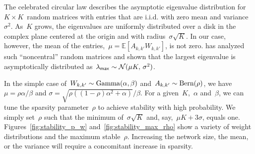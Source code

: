 The celebrated circular law describes the asymptotic eigenvalue distribution for $K\times K$~random matrices with entries that are i.i.d. with zero mean and variance~$\sigma^2$. As~$K$ grows, the eigenvalues are uniformly distributed over a disk in the complex plane centered at the origin and with radius~$\sigma\sqrt{K}$. In our case, however, the mean of the entries,~${\mu=\mathbb{E}[A_{k,k'}W_{k,k'}]}$, is not zero. \citet{Silverstein-1994} has analyzed such ``noncentral'' random matrices and shown that the largest eigenvalue is asymptotically distributed as~${\lambda_{\sf{max}}\sim\mathcal{N}(\mu K,\, \sigma^2)}$.


In the simple case of~${W_{k,k'}\sim \mathrm{Gamma}(\alpha,\beta)}$ and~${A_{k,k'}\sim\mathrm{Bern}(\rho)}$, we have ${\mu = \rho \alpha/\beta}$ and ${\sigma=\sqrt{\rho((1-\rho)\alpha^2+\alpha)}/\beta}$. For a given~$K$,~$\alpha$ and~$\beta$, we can tune the sparsity parameter~$\rho$ to achieve stability with high probability. We simply set~$\rho$ such that the minimum of~$\sigma\sqrt{K}$ and, say,~${\mu K + 3\sigma}$, equals one. Figures~\ref{fig:stability_p_w} and~\ref{fig:stability_max_rho} show a variety of weight distributions and the maximum stable~$\rho$. Increasing the network size, the mean, or the variance will require a concomitant increase in sparsity. 

